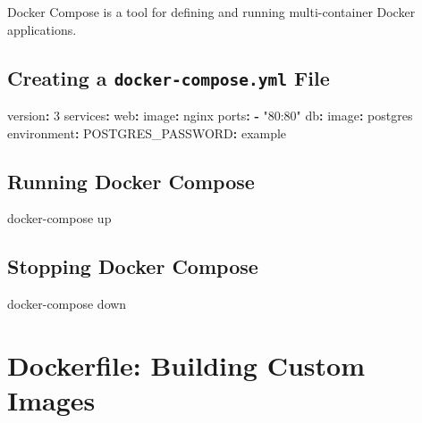 \documentclass[
  letterpaper,
  DIV=11,
  numbers=noendperiod]{scrreprt}
\newenvironment{Shaded}{\begin{snugshade}}{\end{snugshade}}
\newcommand{\AttributeTok}[1]{\textcolor[rgb]{0.40,0.45,0.13}{#1}}
\newcommand{\ExtensionTok}[1]{\textcolor[rgb]{0.00,0.23,0.31}{#1}}
\newcommand{\FunctionTok}[1]{\textcolor[rgb]{0.28,0.35,0.67}{#1}}
\newcommand{\KeywordTok}[1]{\textcolor[rgb]{0.00,0.23,0.31}{\textbf{#1}}}
\newcommand{\NormalTok}[1]{\textcolor[rgb]{0.00,0.23,0.31}{#1}}
\newcommand{\StringTok}[1]{\textcolor[rgb]{0.13,0.47,0.30}{#1}}
\begin{document}
Docker Compose is a tool for defining and running multi-container Docker
applications.

\subsection{\texorpdfstring{Creating a \texttt{docker-compose.yml}
File}{Creating a docker-compose.yml File}}\label{creating-a-docker-compose.yml-file}

\begin{Shaded}
\begin{Highlighting}[]
\FunctionTok{version}\KeywordTok{:}\AttributeTok{ }\StringTok{\textquotesingle{}3\textquotesingle{}}
\FunctionTok{services}\KeywordTok{:}
\AttributeTok{  }\FunctionTok{web}\KeywordTok{:}
\AttributeTok{    }\FunctionTok{image}\KeywordTok{:}\AttributeTok{ nginx}
\AttributeTok{    }\FunctionTok{ports}\KeywordTok{:}
\AttributeTok{      }\KeywordTok{{-}}\AttributeTok{ }\StringTok{"80:80"}
\AttributeTok{  }\FunctionTok{db}\KeywordTok{:}
\AttributeTok{    }\FunctionTok{image}\KeywordTok{:}\AttributeTok{ postgres}
\AttributeTok{    }\FunctionTok{environment}\KeywordTok{:}
\AttributeTok{      }\FunctionTok{POSTGRES\_PASSWORD}\KeywordTok{:}\AttributeTok{ example}
\end{Highlighting}
\end{Shaded}

\subsection{Running Docker Compose}\label{running-docker-compose}

\begin{Shaded}
\begin{Highlighting}[]
\ExtensionTok{docker{-}compose}\NormalTok{ up}
\end{Highlighting}
\end{Shaded}

\subsection{Stopping Docker Compose}\label{stopping-docker-compose}

\begin{Shaded}
\begin{Highlighting}[]
\ExtensionTok{docker{-}compose}\NormalTok{ down}
\end{Highlighting}
\end{Shaded}

\section{Dockerfile: Building Custom
Images}\label{dockerfile-building-custom-images}
\end{document}
